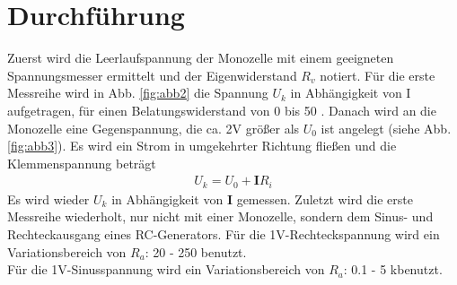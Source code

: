 \section{Durchführung}
\label{sec:Durchführung}
Zuerst wird die Leerlaufspannung der Monozelle mit einem geeigneten Spannungsmesser ermittelt und der Eigenwiderstand $R_v$ notiert.
Für die erste Messreihe wird in Abb. \ref{fig:abb2} die Spannung $U_k$ in Abhängigkeit von I aufgetragen, für einen Belatungswiderstand von 0 bis 50 \Omega .
Danach wird an die Monozelle eine Gegenspannung, die ca. 2V größer als $U_0$ ist angelegt (siehe Abb. \ref{fig:abb3}). 
Es wird ein Strom in umgekehrter Richtung fließen und die Klemmenspannung beträgt
\begin{align}
  U_k = U_0 + \symbf{I} R_i
\end{align}
Es wird wieder $U_k$ in Abhängigkeit von $\symbf{I}$ gemessen.
Zuletzt wird die erste Messreihe wiederholt, nur nicht mit einer Monozelle, sondern dem Sinus- und Rechteckausgang eines RC-Generators.
Für die 1V-Rechteckspannung wird ein Variationsbereich von $R_a$: 20 - 250 \Omega benutzt. \\

Für die 1V-Sinusspannung wird ein Variationsbereich von $R_a$: 0.1 - 5 k\Omega benutzt.